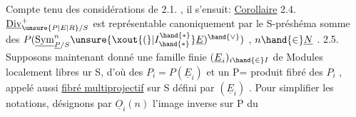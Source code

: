 Compte tenu des considérations de 2.1. , il s'ensuit:
\uline{Corollaire} 2.4. $\underline{\mathrm{Div}}^{+}_{\unsure{P|E|R}/S}$ est représentable canoniquement  par
le S-préshéma somme des $P(\underline{\mathrm{Sym}}^{n}_{\underline{P}/S}\unsure{\xout{(}|I^{\hand{*}}_{\hand{*}}}\underline{E})^{\hand{\vee}})$ , $n \hand{\in} \underline{N}$ .
2.5. Supposons maintenant donné une famille finie $(\underline{E}_i)_{i \hand{\in} I}$ de Modules
localement libres ur S, d'où des $P_i = P(\underline{E}_i)$ et un P= produit fibré des
$P_i$ , appelé aussi \uline{fibré multiprojectif} sur S défini par $(\underline{E}_i)$ . Pour
simplifier les notations, désignons par $\underline{O}_i(n)$ l'image inverse sur P du

